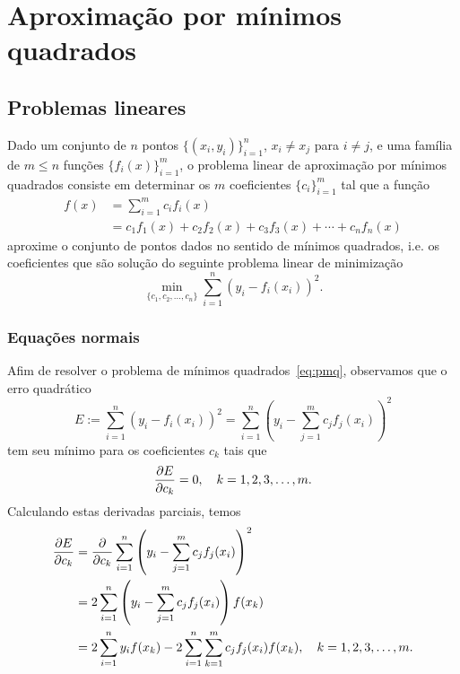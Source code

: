 
\chapter{Aproximação por mínimos quadrados}\label{cap:ajuste}
\thispagestyle{fancy}

\section{Problemas lineares}\label{sec:problemas_lineares}

Dado um conjunto de $n$ pontos $\{(x_i,y_i)\}_{i=1}^n$, $x_i\neq x_j$ para $i\neq j$, e uma família de $m \leq n$ funções $\{f_i(x)\}_{i=1}^m$, o problema linear de aproximação por mínimos quadrados consiste em determinar os $m$ coeficientes $\{c_i\}_{i=1}^m$ tal que a função
\begin{align}    
  f(x) &= \sum_{i=1}^m c_if_i(x) \\
       &= c_1f_1(x) + c_2f_2(x) + c_3f_3(x) + \cdots + c_nf_n(x)
\end{align}
aproxime o conjunto de pontos dados no sentido de mínimos quadrados, i.e. os coeficientes que são solução do seguinte problema linear de minimização
\begin{equation}\label{eq:pmq}
  \min_{\{c_1,c_2,\dotsc,c_n\}} \sum_{i=1}^n (y_i - f_i(x_i))^2.
\end{equation}

\subsection{Equações normais}

Afim de resolver o problema de mínimos quadrados~\eqref{eq:pmq}, observamos que o erro quadrático
\begin{equation}
  E := \sum_{i=1}^n (y_i - f_i(x_i))^2 = \sum_{i=1}^n \left(y_i - \sum_{j=1}^m c_jf_j(x_i)\right)^2
\end{equation}
tem seu mínimo para os coeficientes $c_k$ tais que
\begin{equation}\label{eq:aux1_mq}
  \frac{\partial E}{\partial c_k} = 0,\quad k=1, 2, 3, \dotsc, m.
\end{equation}
Calculando estas derivadas parciais, temos
\begin{align}
  \frac{\partial E}{\partial c_k} &= \frac{\partial}{\partial c_k} \sum_{i=1}^n \left(y_i - \sum_{j=1}^m c_jf_j(x_i)\right)^2\\
    &= 2\sum_{i=1}^n \left(y_i - \sum_{j=1}^m c_jf_j(x_i)\right)f(x_k)\\
    &= 2\sum_{i=1}^n y_if(x_k) - 2\sum_{i=1}^n\sum_{k=1}^m c_jf_j(x_i)f(x_k),\quad k=1, 2, 3, \dotsc, m.
\end{align}

